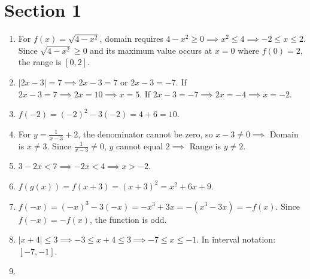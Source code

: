 \documentclass[11pt,a4paper]{article}
\begin{document}
\section*{Section 1}
\begin{enumerate}
    \item For $f(x) = \sqrt{4-x^2}$, domain requires $4-x^2 \ge 0 \implies x^2 \le 4 \implies -2 \le x \le 2$. Since $\sqrt{4-x^2} \ge 0$ and its maximum value occurs at $x=0$ where $f(0)=2$, the range is $[0, 2]$.
    \vspace{0.5cm}

    \item $|2x - 3| = 7 \implies 2x - 3 = 7$ or $2x - 3 = -7$.
    If $2x - 3 = 7 \implies 2x = 10 \implies x = 5$.
    If $2x - 3 = -7 \implies 2x = -4 \implies x = -2$.
    \vspace{0.5cm}

    \item $f(-2) = (-2)^2 - 3(-2) = 4 + 6 = 10$.
    \vspace{0.5cm}

    \item For $y = \frac{1}{x-3} + 2$, the denominator cannot be zero, so $x-3 \neq 0 \implies$ Domain is $x \neq 3$.
    Since $\frac{1}{x-3} \neq 0$, $y$ cannot equal $2 \implies$ Range is $y \neq 2$.
    \vspace{0.5cm}

    \item $3 - 2x < 7 \implies -2x < 4 \implies x > -2$.
    \vspace{0.5cm}

    \item $f(g(x)) = f(x+3) = (x+3)^2 = x^2 + 6x + 9$.
    \vspace{0.5cm}

    \item $f(-x) = (-x)^3 - 3(-x) = -x^3 + 3x = -(x^3 - 3x) = -f(x)$. Since $f(-x) = -f(x)$, the function is odd.
    \vspace{0.5cm}

    \item $|x+4| \le 3 \implies -3 \le x+4 \le 3 \implies -7 \le x \le -1$. In interval notation: $[-7, -1]$.
    \vspace{0.5cm}

    \item 
    \vspace{0.5cm}


\end{enumerate}
\end{document}
